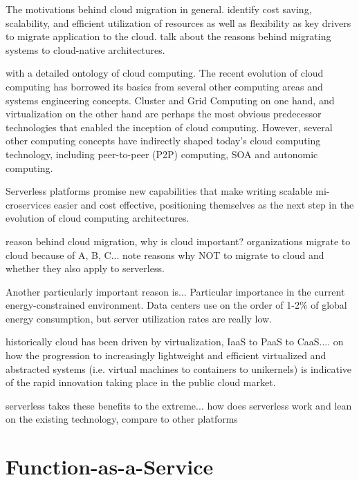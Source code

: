 \documentclass[utf8,english]{gradu3}
\begin{document}
The motivations behind cloud migration in general. \textcite{jamshidi13cloudmigrationreview} identify cost saving, scalability, and efficient utilization of resources as well as flexibility as key drivers to migrate application to the cloud. \textcite{balalaie16migratingcloud} talk about the reasons behind migrating systems to cloud-native architectures.

\textcite{youseff08cloudOntology} with a detailed ontology of cloud computing. The recent evolution of cloud computing has borrowed its basics from several other computing areas and systems engineering concepts. Cluster and Grid Computing on one hand, and virtualization on the other hand are perhaps the most obvious predecessor technologies that enabled the inception of cloud computing. However, several other computing concepts have indirectly shaped today's cloud computing technology, including peer-to-peer (P2P) computing, SOA and autonomic computing.

Serverless platforms promise new capabilities that make writing scalable mi-
croservices easier and cost effective, positioning themselves as the next step in the
evolution of cloud computing architectures. \parencite{baldini17currentTrends}

reason behind cloud migration, why is cloud important? organizations migrate to cloud because of A, B, C... note reasons why NOT to migrate to cloud and whether they also apply to serverless.

Another particularly important reason is... Particular importance in the current energy-constrained environment. Data centers use on the order of 1-2\% of global energy consumption, but server utilization rates are really low. \parencite{horner16powerusage}

historically cloud has been driven by virtualization, IaaS to PaaS to CaaS.... \textcite{bernstein14containers} on how the progression to increasingly lightweight and efficient virtualized and abstracted systems (i.e. virtual machines to containers to unikernels) is indicative of the rapid innovation taking place in the public cloud market.

serverless takes these benefits to the extreme... how does serverless work and lean on the existing technology, compare to other platforms

\section{Function-as-a-Service} \label{faas}
\end{document}
